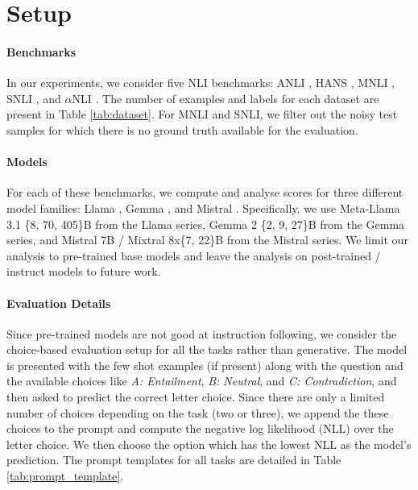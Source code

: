 \section{Setup}

\paragraph{Benchmarks} In our experiments, we consider five NLI benchmarks: ANLI \citep{nie-etal-2020-adversarial}, HANS \citep{mccoy-etal-2019-right}, MNLI \citep{williams-etal-2018-broad}, SNLI \citep{bowman-etal-2015-large}, and $\alpha$NLI \citep{bhagavatula2020abductive}. 
The number of examples and labels for each dataset are present in Table \ref{tab:dataset}. 
For MNLI and SNLI, we filter out the noisy test samples for which there is no ground truth available for the evaluation. %

\paragraph{Models} For each of these benchmarks, we compute and analyse scores for three different model families: Llama \citep{dubey2024llama}, Gemma \citep{team2024gemma}, and Mistral \citep{jiang2023mistral, jiang2024mixtral}. 
Specifically, we use Meta-Llama 3.1 \{8, 70, 405\}B from the Llama series, Gemma 2 \{2, 9, 27\}B from the Gemma series, and Mistral 7B / Mixtral 8x\{7, 22\}B from the Mistral series.
We limit our analysis to pre-trained base models and leave the analysis on post-trained / instruct models to future work.

\paragraph{Evaluation Details} Since pre-trained models are not good at instruction following, we consider the choice-based evaluation setup for all the tasks rather than generative. The model is presented with the few shot examples (if present) along with the question and the available choices like \textit{A: Entailment}, \textit{B: Neutral}, and \textit{C: Contradiction}, and then asked to predict the correct letter choice. Since there are only a limited number of choices depending on the task (two or three), we append the these choices to the prompt and compute the negative log likelihood (NLL) over the letter choice. We then choose the option which has the lowest NLL as the model's prediction. The prompt templates for all tasks are detailed in Table \ref{tab:prompt_template}.


